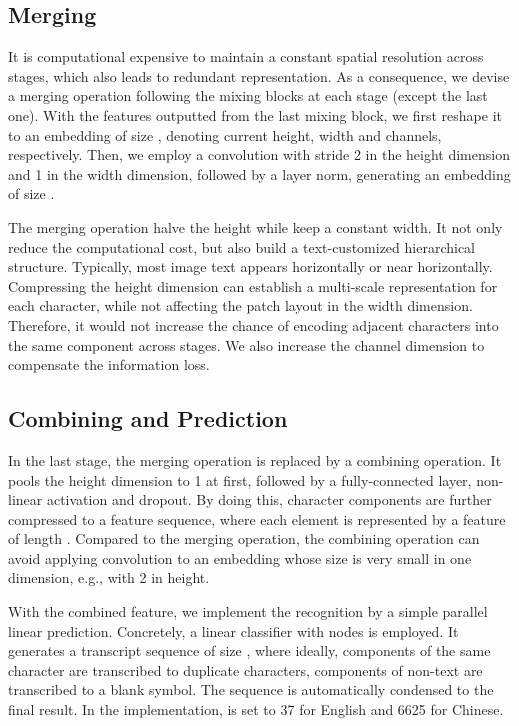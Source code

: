 \documentclass{article}
\begin{document}
\subsection{Merging}

It is computational expensive to maintain a constant spatial resolution 
across stages, which also leads to redundant representation. As a consequence, we devise a merging operation following the mixing blocks at each stage (except the last one). With the features outputted from the last mixing block, we first reshape it to an embedding of size , denoting current height, width and channels, respectively. Then, we employ a  convolution with stride 2 in the height dimension and 1 in the width dimension, followed by a layer norm, generating an embedding of size .

The merging operation halve the height while keep a constant width. It not only reduce the computational cost, but also build a text-customized hierarchical structure. Typically, most image text appears horizontally or near horizontally. Compressing the height dimension can establish a multi-scale representation for each character, while not affecting the patch layout in the width dimension. Therefore, it would not increase the chance of encoding adjacent characters into the same component across stages. We also increase the channel dimension  to compensate the information loss.




\subsection{Combining and Prediction}
In the last stage, the merging operation is replaced by a combining operation. It pools the height dimension to 1 at first, followed by a fully-connected layer, non-linear activation and dropout. By doing this, character components are further compressed to a feature sequence, where each element is represented by a feature of length . Compared to the merging operation, the combining operation can avoid applying convolution to an embedding whose size is very small in one dimension, e.g., with 2 in height.

With the combined feature, we implement the recognition by a simple parallel linear prediction. Concretely, a linear classifier with  nodes is employed. It generates a transcript sequence of size , where ideally, components of the same character are transcribed to duplicate characters, components of non-text are transcribed to a blank symbol. The sequence is automatically condensed to the final result. In the implementation,  is set to 37 for English and 6625 for Chinese.
\end{document}
